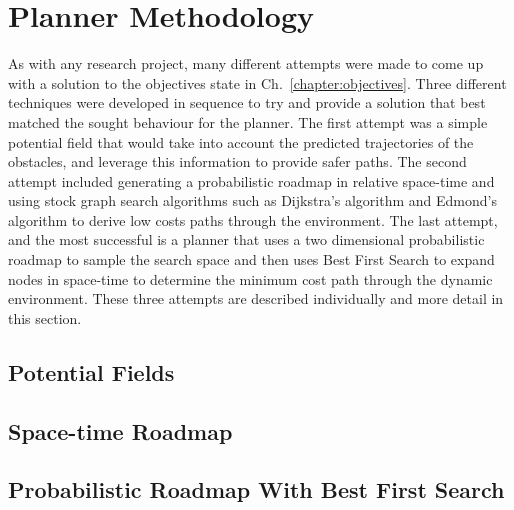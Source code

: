 


\chapter{Planner Methodology}

\label{chapter:plannermethodology}

As with any research project, many different attempts were made to come up with
a solution to the objectives state in Ch.~\ref{chapter:objectives}. Three
different techniques were developed in sequence to try and provide a solution
that best matched the sought behaviour for the planner. The first attempt was a
simple potential field that would take into account the predicted trajectories
of the obstacles, and leverage this information to provide safer paths. The
second attempt included generating a probabilistic roadmap in relative
space-time and using stock graph search algorithms such as Dijkstra's algorithm
and Edmond's algorithm to derive low costs paths through the environment. The
last attempt, and the most successful is a planner that uses a two dimensional
probabilistic roadmap to sample the search space and then uses Best First
Search to expand nodes in space-time to determine the minimum cost path through
the dynamic environment. These three attempts are described individually and
more detail in this section.

\section{Potential Fields}

\section{Space-time Roadmap}

\section{Probabilistic Roadmap With Best First Search}


